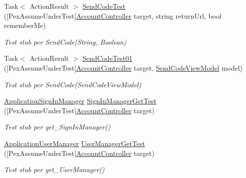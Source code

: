 \begin{DoxyCompactItemize}
Task$<$ Action\+Result $>$ \mbox{\hyperlink{class_brew_day2_1_1_controllers_1_1_testsn_1_1_account_controller_test_ae9aee8bf96728cbea4ae856e3232d5a5}{Send\+Code\+Test}} (\mbox{[}Pex\+Assume\+Under\+Test\mbox{]}\mbox{\hyperlink{class_brew_day2_1_1_controllers_1_1_account_controller}{Account\+Controller}} target, string return\+Url, bool remember\+Me)
\begin{DoxyCompactList}\small\item\em Test stub per Send\+Code(\+String, Boolean)\end{DoxyCompactList}\item 
Task$<$ Action\+Result $>$ \mbox{\hyperlink{class_brew_day2_1_1_controllers_1_1_testsn_1_1_account_controller_test_afeef22e3876cfb9863229218b9f657db}{Send\+Code\+Test01}} (\mbox{[}Pex\+Assume\+Under\+Test\mbox{]}\mbox{\hyperlink{class_brew_day2_1_1_controllers_1_1_account_controller}{Account\+Controller}} target, \mbox{\hyperlink{class_brew_day2_1_1_models_1_1_send_code_view_model}{Send\+Code\+View\+Model}} model)
\begin{DoxyCompactList}\small\item\em Test stub per Send\+Code(\+Send\+Code\+View\+Model)\end{DoxyCompactList}\item 
\mbox{\hyperlink{class_brew_day2_1_1_application_sign_in_manager}{Application\+Sign\+In\+Manager}} \mbox{\hyperlink{class_brew_day2_1_1_controllers_1_1_testsn_1_1_account_controller_test_ad26cc478bc9a9fb0bd6739a640ccaffd}{Sign\+In\+Manager\+Get\+Test}} (\mbox{[}Pex\+Assume\+Under\+Test\mbox{]}\mbox{\hyperlink{class_brew_day2_1_1_controllers_1_1_account_controller}{Account\+Controller}} target)
\begin{DoxyCompactList}\small\item\em Test stub per get\+\_\+\+Sign\+In\+Manager()\end{DoxyCompactList}\item 
\mbox{\hyperlink{class_brew_day2_1_1_application_user_manager}{Application\+User\+Manager}} \mbox{\hyperlink{class_brew_day2_1_1_controllers_1_1_testsn_1_1_account_controller_test_a761568223769fd5c42e8091df3ba2fcc}{User\+Manager\+Get\+Test}} (\mbox{[}Pex\+Assume\+Under\+Test\mbox{]}\mbox{\hyperlink{class_brew_day2_1_1_controllers_1_1_account_controller}{Account\+Controller}} target)
\begin{DoxyCompactList}\small\item\em Test stub per get\+\_\+\+User\+Manager()\end{DoxyCompactList}\item 

\end{DoxyCompactItemize}
